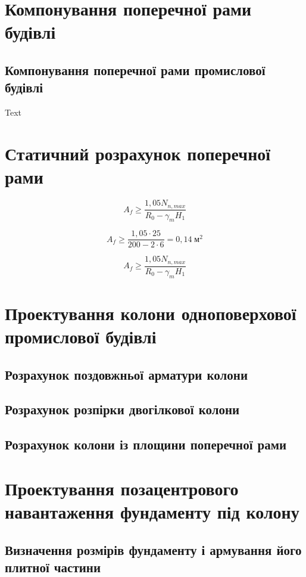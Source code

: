 \documentclass[a4paper,14pt]{article}
\author{}
\title{}
\date{\today}
\begin{document}
\section{Компонування поперечної рами будівлі}
\subsection{Компонування поперечної рами промислової будівлі}
Text
\newpage
\section{Статичний розрахунок поперечної рами}
\begin{equation}
    A_f\geqslant\frac{1,05N_{n,max}}{R_0-\gamma_mH_1} 
\end{equation}

$$A_f\geqslant\frac{1,05\cdot25}{200-2\cdot6}=0,14\;{\textit{м}^2}$$

\begin{equation}
    A_f\geqslant\frac{1,05N_{n,max}}{R_0-\gamma_mH_1} 
\end{equation}
\newpage
\section{Проектування колони одноповерхової промислової будівлі}
\subsection{Розрахунок поздовжньої арматури колони}


\subsection{Розрахунок розпірки двогілкової колони}

\subsection{Розрахунок колони із площини поперечної рами}
\newpage
\section{Проектування позацентрового навантаження фундаменту під колону}
\subsection{Визначення розмірів фундаменту і армування його плитної частини}
\end{document}
